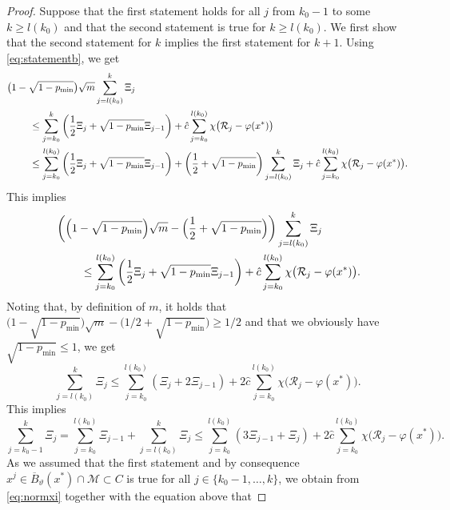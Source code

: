 \documentclass[a4paper, 12pt]{article}
\numberwithin{equation}{section}
\theoremstyle{bolddef}
\theoremstyle{definition}
\theoremstyle{boldplain}
\newcommand{\xj}{x^j}
\newcommand{\pmin}{p_{\min}}
\newcommand{\Rvalue}{\mathcal{R}}
\newcommand{\clball}{\overline{B}}
\begin{document}
\begin{proof}
Suppose that the first statement holds for all $j$ from $k_0-1$ to some $k \geq l(k_0)$ and that the second statement is true for $k \geq l(k_0)$. We first show that the second statement for $k$ implies the first statement for $k+1$. Using \eqref{eq:statementb}, we get
\begin{align*}
   & \big( 1-\sqrt{1-\pmin} \big) 
   \sqrt{m}\sum_{j = l(k_0)}^k \Xi_j \\
	& \hspace*{8mm} \leq \sum_{j = k_0}^k \left(\frac{1}{2}\Xi_j+\sqrt{1-p_{\min}}   \Xi_{j-1}\right) + \hat c \sum_{j = k_0}^{l(k_0)} \chi \big( \Rvalue_j - \varphi(x^*) \big) \\
	& \hspace*{8mm} \leq \sum_{j = k_0}^{l(k_0)} \left(\frac{1}{2} \Xi_j + \sqrt{1-p_{\min}} \Xi_{j-1}\right) + \left( \frac{1}{2} + \sqrt{1- \pmin}\right) \sum_{j = l(k_0)}^{k} \Xi_j + \hat c \sum_{j = k_0}^{l(k_0)} \chi \big( \Rvalue_j - \varphi(x^*) \big).
\end{align*}
This implies 
\begin{align*}
   & \left( \Big(1-\sqrt{1-\pmin} \Big)\sqrt{m} - \Big(\frac{1}{2} + \sqrt{1-\pmin} \Big) \right) \sum_{j = l(k_0)}^k \Xi_j \\
	& \hspace*{8mm} \leq \sum_{j = k_0}^{l(k_0)} \left(\frac{1}{2} \Xi_j + \sqrt{1-p_{\min}} \Xi_{j-1}\right) + \hat c \sum_{j = k_0}^{l(k_0)}
   \chi \big( \Rvalue_j - \varphi(x^*) \big).
\end{align*}
Noting that, by definition of $m$, it holds that 
$\big( 1-\sqrt{1-\pmin} \big) \sqrt{m} - 
\big( 1/2 + \sqrt{1- \pmin} \big) \geq 1/2$ and that we obviously
have $\sqrt{1-\pmin} \leq 1$, we get
\begin{equation*}
	\sum_{j=l(k_0)}^k \Xi_j \leq \sum_{j=k_0}^{l(k_0)} (\Xi_j + 2 \Xi_{j-1}) + 2 \hat c \sum_{j = k_0}^{l(k_0)} \chi \big( \Rvalue_j - \varphi(x^*) \big).
\end{equation*}
This implies
\begin{equation}\label{eq:sumXis}
	\sum_{j=k_0-1}^k \Xi_j = \sum_{j=k_0}^{l(k_0)} \Xi_{j-1} + \sum_{j=l(k_0)}^k \Xi_j \leq \sum_{j=k_0}^{l(k_0)} (3 \Xi_{j-1} + \Xi_j) + 2 \hat c \sum_{j = k_0}^{l(k_0)}\chi \big( \Rvalue_j - \varphi(x^*) \big).
\end{equation}
As we assumed that the first statement and by consequence $\xj \in \clball_\vartheta(x^*) \cap \mathcal {M} \subset C$ is true for all $j \in \{k_0 -1, \dots, k\}$, we obtain from \eqref{eq:normxi} together with the equation above that

\end{proof}
\end{document}
